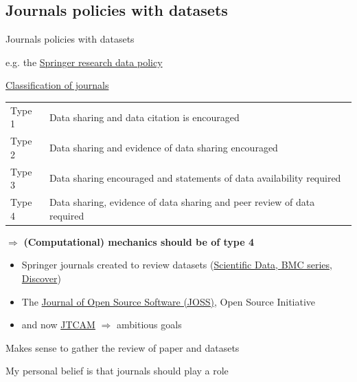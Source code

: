 \documentclass[10pt,compress,serif,aspectratio=169]{beamer}
\begin{document}
\subsection{Journals policies with datasets}
\begin{frame}{Journals policies with datasets}


e.g. the \href{https://www.springernature.com/gp/authors/research-data-policy}{Springer research data policy}\newline

\href{https://group.springernature.com/gp/group/media/press-releases/archive-2016/over-600-springer-nature-journals-commit-to-new-data-sharing-policies/12000254}{Classification of journals}
\begin{tabular}{ll}
 Type 1 & Data sharing and data citation is encouraged                            \\
 Type 2 & Data sharing and evidence of data sharing encouraged                    \\
 Type 3 & Data sharing encouraged and statements of data availability required    \\
 Type 4 & Data sharing, evidence of data sharing and peer review of data required \\
\end{tabular}\newline\newline
\pause
$\Rightarrow$ \textbf{(Computational) mechanics should be of type 4}
\pause
\vfill

\begin{itemize}
  \item Springer journals created to review datasets (\href{https://www.springernature.com/gp/authors/research-data/research-data-publishing}{Scientific Data, BMC series, Discover})
  \item The \href{https://joss.theoj.org/about}{Journal of Open Source Software (JOSS)}, Open Source Initiative\\
\pause
  \item and now \href{https://jtcam.episciences.org/}{JTCAM} $\Rightarrow$ ambitious goals
\end{itemize}
\pause
\vfill
\begin{center}
{\Large Makes sense to gather the review of paper and datasets}
\end{center}
\begin{center}
\pause
    {\alert{\Large My personal belief is that journals should play a role}}
\end{center}

\end{frame}
\end{document}
